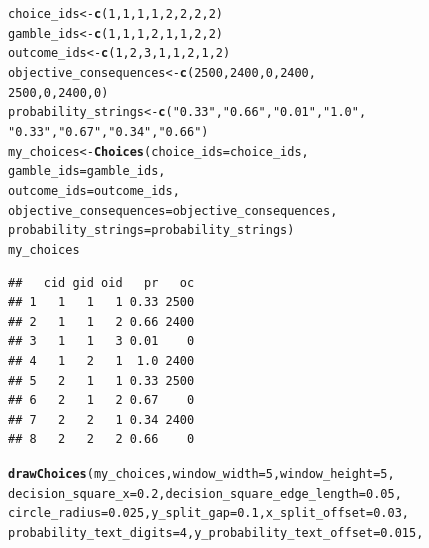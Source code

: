 \documentclass{article}\usepackage[]{graphicx}\usepackage[]{color}
\makeatletter
\newcommand{\hlnum}[1]{\textcolor[rgb]{0.686,0.059,0.569}{#1}}%
\newcommand{\hlstr}[1]{\textcolor[rgb]{0.192,0.494,0.8}{#1}}%
\newcommand{\hlstd}[1]{\textcolor[rgb]{0.345,0.345,0.345}{#1}}%
\newcommand{\hlkwb}[1]{\textcolor[rgb]{0.69,0.353,0.396}{#1}}%
\newcommand{\hlkwc}[1]{\textcolor[rgb]{0.333,0.667,0.333}{#1}}%
\newcommand{\hlkwd}[1]{\textcolor[rgb]{0.737,0.353,0.396}{\textbf{#1}}}%
\newenvironment{kframe}{%
 \def\at@end@of@kframe{}%
 \ifinner\ifhmode%
  \def\at@end@of@kframe{\end{minipage}}%
  \begin{minipage}{\columnwidth}%
 \fi\fi%
 \def\FrameCommand##1{\hskip\@totalleftmargin \hskip-\fboxsep
 \colorbox{shadecolor}{##1}\hskip-\fboxsep
     \hskip-\linewidth \hskip-\@totalleftmargin \hskip\columnwidth}%
 \MakeFramed {\advance\hsize-\width
   \@totalleftmargin\z@ \linewidth\hsize
   \@setminipage}}%
 {\par\unskip\endMakeFramed%
 \at@end@of@kframe}
\newenvironment{knitrout}{}{} %
\makeatother
\begin{document}
\begin{knitrout}
\color{fgcolor}\begin{kframe}
\begin{alltt}
\hlstd{choice_ids} \hlkwb{<-} \hlkwd{c}\hlstd{(}\hlnum{1}\hlstd{,} \hlnum{1}\hlstd{,} \hlnum{1}\hlstd{,} \hlnum{1}\hlstd{,} \hlnum{2}\hlstd{,} \hlnum{2}\hlstd{,} \hlnum{2}\hlstd{,} \hlnum{2}\hlstd{)}
\hlstd{gamble_ids} \hlkwb{<-} \hlkwd{c}\hlstd{(}\hlnum{1}\hlstd{,} \hlnum{1}\hlstd{,} \hlnum{1}\hlstd{,} \hlnum{2}\hlstd{,} \hlnum{1}\hlstd{,} \hlnum{1}\hlstd{,} \hlnum{2}\hlstd{,} \hlnum{2}\hlstd{)}
\hlstd{outcome_ids} \hlkwb{<-} \hlkwd{c}\hlstd{(}\hlnum{1}\hlstd{,} \hlnum{2}\hlstd{,} \hlnum{3}\hlstd{,} \hlnum{1}\hlstd{,} \hlnum{1}\hlstd{,} \hlnum{2}\hlstd{,} \hlnum{1}\hlstd{,} \hlnum{2}\hlstd{)}
\hlstd{objective_consequences} \hlkwb{<-} \hlkwd{c}\hlstd{(}\hlnum{2500}\hlstd{,} \hlnum{2400}\hlstd{,} \hlnum{0}\hlstd{,} \hlnum{2400}\hlstd{,}
        \hlnum{2500}\hlstd{,} \hlnum{0}\hlstd{,} \hlnum{2400}\hlstd{,} \hlnum{0}\hlstd{)}
\hlstd{probability_strings} \hlkwb{<-} \hlkwd{c}\hlstd{(}\hlstr{"0.33"}\hlstd{,} \hlstr{"0.66"}\hlstd{,} \hlstr{"0.01"}\hlstd{,} \hlstr{"1.0"}\hlstd{,}
        \hlstr{"0.33"}\hlstd{,} \hlstr{"0.67"}\hlstd{,} \hlstr{"0.34"}\hlstd{,} \hlstr{"0.66"}\hlstd{)}
\hlstd{my_choices} \hlkwb{<-} \hlkwd{Choices}\hlstd{(}\hlkwc{choice_ids}\hlstd{=choice_ids,}
        \hlkwc{gamble_ids}\hlstd{=gamble_ids,}
        \hlkwc{outcome_ids}\hlstd{=outcome_ids,}
        \hlkwc{objective_consequences}\hlstd{=objective_consequences,}
        \hlkwc{probability_strings}\hlstd{=probability_strings)}
\hlstd{my_choices}
\end{alltt}
\begin{verbatim}
##   cid gid oid   pr   oc
## 1   1   1   1 0.33 2500
## 2   1   1   2 0.66 2400
## 3   1   1   3 0.01    0
## 4   1   2   1  1.0 2400
## 5   2   1   1 0.33 2500
## 6   2   1   2 0.67    0
## 7   2   2   1 0.34 2400
## 8   2   2   2 0.66    0
\end{verbatim}
\begin{alltt}
\hlkwd{drawChoices}\hlstd{(my_choices,} \hlkwc{window_width}\hlstd{=}\hlnum{5}\hlstd{,} \hlkwc{window_height}\hlstd{=}\hlnum{5}\hlstd{,}
        \hlkwc{decision_square_x}\hlstd{=}\hlnum{0.2}\hlstd{,} \hlkwc{decision_square_edge_length}\hlstd{=}\hlnum{0.05}\hlstd{,}
        \hlkwc{circle_radius}\hlstd{=}\hlnum{0.025}\hlstd{,} \hlkwc{y_split_gap}\hlstd{=}\hlnum{0.1}\hlstd{,} \hlkwc{x_split_offset}\hlstd{=}\hlnum{0.03}\hlstd{,}
        \hlkwc{probability_text_digits}\hlstd{=}\hlnum{4}\hlstd{,} \hlkwc{y_probability_text_offset}\hlstd{=}\hlnum{0.015}\hlstd{,}

\end{alltt}
\end{kframe}
\end{knitrout}
\end{document}
